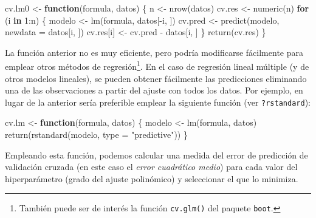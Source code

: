 \documentclass[
]{book}
\newenvironment{Shaded}{\begin{snugshade}}{\end{snugshade}}
\newcommand{\AttributeTok}[1]{\textcolor[rgb]{0.77,0.63,0.00}{#1}}
\newcommand{\ControlFlowTok}[1]{\textcolor[rgb]{0.13,0.29,0.53}{\textbf{#1}}}
\newcommand{\DecValTok}[1]{\textcolor[rgb]{0.00,0.00,0.81}{#1}}
\newcommand{\FunctionTok}[1]{\textcolor[rgb]{0.00,0.00,0.00}{#1}}
\newcommand{\NormalTok}[1]{#1}
\newcommand{\OtherTok}[1]{\textcolor[rgb]{0.56,0.35,0.01}{#1}}
\newcommand{\SpecialCharTok}[1]{\textcolor[rgb]{0.00,0.00,0.00}{#1}}
\newcommand{\StringTok}[1]{\textcolor[rgb]{0.31,0.60,0.02}{#1}}
\theoremstyle{break}
\theoremstyle{definition}
\theoremstyle{definition}
\theoremstyle{definition}
\theoremstyle{definition}
\theoremstyle{remark}
\begin{document}
\begin{Shaded}
\begin{Highlighting}[]
\NormalTok{cv.lm0 }\OtherTok{\textless{}{-}} \ControlFlowTok{function}\NormalTok{(formula, datos) \{}
\NormalTok{    n }\OtherTok{\textless{}{-}} \FunctionTok{nrow}\NormalTok{(datos)}
\NormalTok{    cv.res }\OtherTok{\textless{}{-}} \FunctionTok{numeric}\NormalTok{(n)}
    \ControlFlowTok{for}\NormalTok{ (i }\ControlFlowTok{in} \DecValTok{1}\SpecialCharTok{:}\NormalTok{n) \{}
\NormalTok{        modelo }\OtherTok{\textless{}{-}} \FunctionTok{lm}\NormalTok{(formula, datos[}\SpecialCharTok{{-}}\NormalTok{i, ])}
\NormalTok{        cv.pred }\OtherTok{\textless{}{-}} \FunctionTok{predict}\NormalTok{(modelo, }\AttributeTok{newdata =}\NormalTok{ datos[i, ])}
\NormalTok{        cv.res[i] }\OtherTok{\textless{}{-}}\NormalTok{ cv.pred }\SpecialCharTok{{-}}\NormalTok{ datos[i, ]}
\NormalTok{    \}}
    \FunctionTok{return}\NormalTok{(cv.res)}
\NormalTok{\}}
\end{Highlighting}
\end{Shaded}

La función anterior no es muy eficiente, pero podría modificarse fácilmente para emplear otros métodos de regresión\footnote{También puede ser de interés la función \texttt{cv.glm()} del paquete \texttt{boot}.}.
En el caso de regresión lineal múltiple (y de otros modelos lineales), se pueden obtener fácilmente las predicciones eliminando una de las observaciones a partir del ajuste con todos los datos.
Por ejemplo, en lugar de la anterior sería preferible emplear la siguiente función (ver \texttt{?rstandard}):

\begin{Shaded}
\begin{Highlighting}[]
\NormalTok{cv.lm }\OtherTok{\textless{}{-}} \ControlFlowTok{function}\NormalTok{(formula, datos) \{}
\NormalTok{    modelo }\OtherTok{\textless{}{-}} \FunctionTok{lm}\NormalTok{(formula, datos)}
    \FunctionTok{return}\NormalTok{(}\FunctionTok{rstandard}\NormalTok{(modelo, }\AttributeTok{type =} \StringTok{"predictive"}\NormalTok{))}
\NormalTok{\}}
\end{Highlighting}
\end{Shaded}

Empleando esta función, podemos calcular una medida del error de predicción de validación cruzada (en este caso el \emph{error cuadrático medio}) para cada valor del hiperparámetro (grado del ajuste polinómico) y seleccionar el que lo minimiza.
\end{document}

